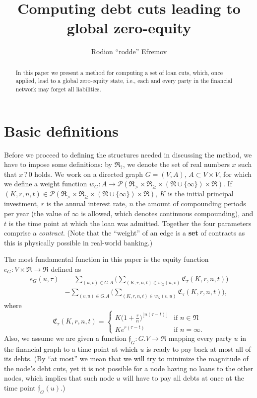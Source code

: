 \documentclass[10pt]{article}
\title{Computing debt cuts leading to global zero-equity}
\author{Rodion ``rodde'' Efremov}
\begin{document}
  \maketitle
  
  \begin{abstract}
  In this paper we present a method for computing a set of loan cuts, which, once applied, lead to a global zero-equity state, i.e., each and every party in the financial network may forget all liabilities. 
  \end{abstract}
  
  \section{Basic definitions}
  Before we proceed to defining the structures needed in discussing the method, we have to impose some definitions: by $\mathfrak{R}_?$, we denote the set of real numbers $x$ such that $x \, ? \, 0$ holds. We work on a directed graph $G=(V,A)$, $A \subset V \times V$, for which we define a weight function $w_G \colon A \to \mathcal{P}(\mathfrak{R}_> \times \mathfrak{R}_{\geq} \times (\mathfrak{N} \cup \{\infty\}) \times \mathfrak{R})$. If $(K, r, n, t) \in \mathcal{P}(\mathfrak{R}_> \times \mathfrak{R}_{\geq} \times (\mathfrak{N} \cup \{\infty\}) \times \mathfrak{R})$, $K$ is the initial principal investment, $r$ is the annual interest rate, $n$ the amount of compounding periods per year (the value of $\infty$ is allowed, which denotes continuous compounding), and $t$ is the time point at which the loan was admitted. Together the four parameters comprise a \textit{contract}. (Note that the ``weight'' of an edge is a \textbf{set} of contracts as this is physically possible in real-world banking.) 

The most fundamental function in this paper is the equity function $e_G \colon V \times \mathfrak{R} \to \mathfrak{R}$ defined as 
\begin{align*}
e_G(u, \tau) &= \sum_{(u, v) \in G.A} \Bigg( \sum_{(K, r, n, t) \in w_G(u,v)} \mathfrak{C}_{\tau}(K, r, n, t) \Bigg) \\
                   &- \sum_{(v, u) \in G.A} \Bigg( \sum_{(K, r, n, t) \in w_G(v, u)} \mathfrak{C}_{\tau}(K, r, n, t) \Bigg),
\end{align*}
where 
\[
\mathfrak{C}_{\tau}(K, r, n, t) = 
\begin{cases}
K\big( 1 + \frac{r}{n}\big)^{\lfloor n(\tau - t) \rfloor} & \mbox{if } n \in \mathfrak{N} \\
Ke^{r(\tau - t)} & \mbox{if } n = \infty.
\end{cases}
\]
Also, we assume we are given a function $\mathfrak{f}_G \colon G.V \to \mathfrak{R}$ mapping every party $u$ in the financial graph to a time point at which $u$ is ready to pay back at most all of its debts. (By ``at most'' we mean that we will try to minimize the magnitude of the node's debt cuts, yet it is not possible for a node having no loans to the other nodes, which implies that such node $u$ will have to pay all debts at once at the time point $\mathfrak{f}_G(u)$.)
\end{document}
